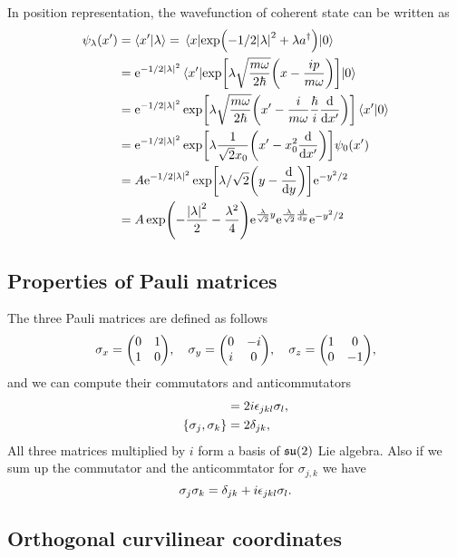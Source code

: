 \documentclass[10pt]{article}
\begin{document}
	In position representation, the wavefunction of coherent state can be written as
	\begin{align*}
		\psi_{\lambda}(x') &= \braket{x'}{\lambda} = \mel{x}{\exp(-1/2 \abs{\lambda}^2 + \lambda a^{\dagger})}{0} \\
		&= {\mathrm{e}}^{-1/2 \abs{\lambda}^2} \mel{x'}{\exp[\lambda \sqrt{\frac{m\omega}{2\hbar}} \qty(x - \frac{ip}{m\omega})]}{0} \\
		&= {\mathrm{e}}^{-1/2 \abs{\lambda}^2} \exp[\lambda \sqrt{\frac{m\omega}{2\hbar}} \qty(x' - \frac{i}{m\omega} \frac{\hbar}{i}\dv{x'})] \braket{x'}{0} \\
		&= {\mathrm{e}}^{-1/2 \abs{\lambda}^2} \exp[\lambda \frac{1}{\sqrt{2} x_0} \qty(x' - x_0^2\dv{x'})] \psi_0(x') \\
		&= A {\mathrm{e}}^{-1/2 \abs{\lambda}^2} \exp[\lambda/\sqrt{2} \qty(y - \dv{y})] {\mathrm{e}}^{-y^2/2} \\
		&= A \exp(-\frac{\abs{\lambda}^2}{2} - \frac{\lambda^2}{4}) {\mathrm{e}}^{\frac{\lambda}{\sqrt{2}} y} {\mathrm{e}}^{\frac{\lambda}{\sqrt{2}} \dv{y}} {\mathrm{e}}^{-y^2/2}
	\end{align*}


	\subsection{Properties of Pauli matrices}

	The three Pauli matrices are defined as follows
	\begin{equation}
		\sigma_x = \mqty(\pmat{1}), \quad \sigma_y = \mqty(\pmat{2}), \quad \sigma_z = \mqty(\pmat{3}),
	\end{equation}
	and we can compute their commutators and anticommutators
	\begin{align}
		[\sigma_j, \sigma_k] &= 2i \eps_{jkl} \sigma_l, \\
		\{ \sigma_j, \sigma_k \} &= 2 \delta_{jk},
	\end{align}
	All three matrices multiplied by $i$ form a basis of ${\mathfrak{s}}{\mathfrak{u}}(2)$ Lie algebra.
	Also if we sum up the commutator and the anticommtator for $\sigma_{j,k}$ we have
	\begin{equation}
		\sigma_j \sigma_k = \delta_{jk} + i \epsilon_{jkl} \sigma_l.
	\end{equation}

	\subsection{Orthogonal curvilinear coordinates}
\end{document}
